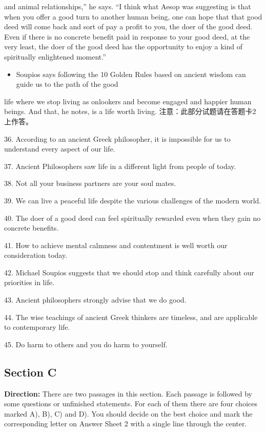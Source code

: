 \documentclass[UTF8,11pt]{ctexart}
\begin{document}
and animal relationships,” he says. “I think what Aesop was suggesting is that when you offer a good turn to another human being, one can hope that that good deed will come back and sort of pay a profit to you, the doer of the good deed. Even if there is no concrete benefit paid in response to your good deed, at the very least, the doer of the good deed has the opportunity to enjoy a kind of spiritually enlightened moment.”


\begin{itemize}[leftmargin=2em,itemsep=.2em,topsep=.4em]\item[M.] Soupios says following the 10 Golden Rules based on ancient wisdom can guide us to the path of the good
\end{itemize}

life where we stop living as onlookers and become engaged and happier human beings. And that, he notes, is a life worth living. 注意：此部分试题请在答题卡2 上作答。


36. According to an ancient Greek philosopher, it is impossible for us to understand every aspect of our life.


37. Ancient Philosophers saw life in a different light from people of today.


38. Not all your business partners are your soul mates.


39. We can live a peaceful life despite the various challenges of the modern world.


40. The doer of a good deed can feel spiritually rewarded even when they gain no concrete benefits.


41. How to achieve mental calmness and contentment is well worth our consideration today.


42. Michael Soupios suggests that we should stop and think carefully about our priorities in life.


43. Ancient philosophers strongly advise that we do good.


44. The wise teachings of ancient Greek thinkers are timeless, and are applicable to contemporary life.


45. Do harm to others and you do harm to yourself.


\subsection*{\textbf{Section C}}


\textbf{Direction:} There are two passages in this section. Each passage is followed by some questions or unfinished statements. For each of them there are four choices marked A), B), C) and D). You should decide on the best choice and mark the corresponding letter on Answer Sheet 2 with a single line through the center.
\end{document}
